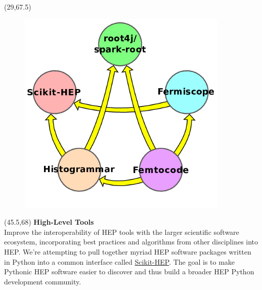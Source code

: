 \documentclass[final]{beamer}
\begin{document}
\begin{frame}{}
\begin{textblock}{12.5}(29,67.5)
\begin{figure}[tbph]
\centering
\includegraphics[width=0.9\textwidth]{images/relationships_nolabels.png}
\end{figure}
\end{textblock}


\begin{textblock}{23}(45.5,68)
\textcolor{mybluelabel}{\bf High-Level Tools} \\
Improve the interoperability of HEP tools with the larger scientific software ecosystem, incorporating best practices and algorithms from other disciplines into HEP.
We're attempting to pull together myriad HEP software packages written in Python into a common interface called \href{http://scikit-hep.org/}{Scikit-HEP}.
The goal is to make Pythonic HEP software easier to discover and thus build a broader HEP Python development community.
\end{textblock}


\end{frame}
\end{document}
